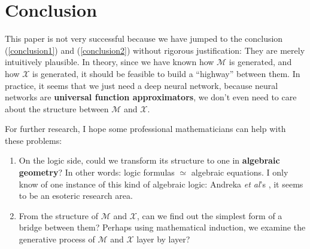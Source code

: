 \documentclass[orivec]{llncs}
\begin{document}
\section{Conclusion}

This paper is not very successful because we have jumped to the conclusion  (\ref{conclusion1}) and (\ref{conclusion2}) without rigorous justification:  They are merely intuitively plausible.  In theory, since we have known how $\mathcal{M}$ is generated, and how $\mathcal{X}$ is generated, it should be feasible to build a ``highway'' between them.  In practice, it seems that we just need a deep neural network, because neural networks are \textbf{universal function approximators}, we don't even need to care about the structure between $\mathcal{M}$ and $\mathcal{X}$.


For further research, I hope some professional mathematicians can help with these problems:
\begin{enumerate}
\item On the logic side, could we transform its structure to one in \textbf{algebraic geometry}? In other words:  logic formulas $\simeq$ algebraic equations.  I only know of one instance of this kind of algebraic logic: Andreka \textit{et al}'s \cite{Andreka2001}, it seems to be an esoteric research area.
\item From the structure of $\mathcal{M}$ and $\mathcal{X}$, can we find out the simplest form of a bridge between them?  Perhaps using mathematical induction, we examine the generative process of $\mathcal{M}$ and $\mathcal{X}$ layer by layer?
\end{enumerate}
\end{document}
